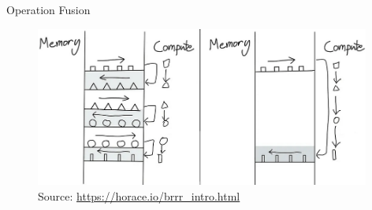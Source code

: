 
\begin{vbframe}{Operation Fusion}

\vfill

\begin{figure}
	\centering
	\includegraphics[width = 11cm]{./figure/op_fusion.png} \\ 
	{\footnotesize Source: \href{https://horace.io/brrr_intro.html}{\url{https://horace.io/brrr_intro.html}}}
\end{figure}

\vfill

\end{vbframe}


    
    

